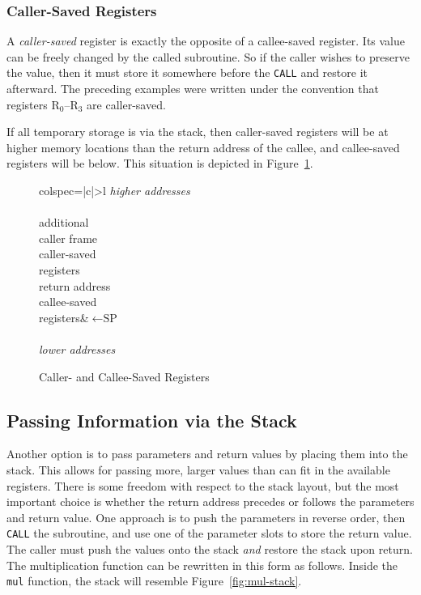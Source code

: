 \documentclass[12pt,english]{book}
\newcommand*{\concept}[2][]{%
  \textit{#2}\ifx#1\empty\empty\index{#2}\else\index{#1}\fi}
\begin{document}
\subsubsection{Caller-Saved Registers}
A \concept{caller-saved} register is exactly the opposite
of a callee-saved register.
Its value can be freely changed by the called subroutine.
So if the caller wishes to preserve the value,
then it must store it somewhere before the \texttt{CALL}
and restore it afterward.
The preceding examples were written under the convention
that registers \(\text{R}_0\)--\(\text{R}_3\) are caller-saved.

If all temporary storage is via the stack,
then caller-saved registers will be at higher memory locations
than the return address of the callee,
and callee-saved registers will be below.
This situation is depicted in Figure~\ref{fig:who-saves}.

\begin{figure}[ht!]\centering
  \begin{tblr}{colspec={|c|>{\hspace*{-3mm}}l}}
    \textit{higher addresses}\\\\
    additional\\
    caller frame\\
    caller-saved\\
    registers\\
    return address\\
    callee-saved\\
    registers&\({}\leftarrow\text{SP}\)\\\\
    \textit{lower addresses}\\
  \end{tblr}
  \caption{Caller- and Callee-Saved Registers}
  \label{fig:who-saves}
\end{figure}

\subsection{Passing Information via the Stack}
Another option is to pass parameters and return values
by placing them into the stack.
This allows for passing more, larger values
than can fit in the available registers.
There is some freedom with respect to the stack layout,
but the most important choice
is whether the return address precedes
or follows the parameters and return value.
One approach is to push the parameters in reverse order,
then \texttt{CALL} the subroutine,
and use one of the parameter slots to store
the return value.
The caller must push the values onto the stack
\emph{and} restore the stack upon return.
The multiplication function can be rewritten in this form
as follows.
Inside the \texttt{\textunderscore mul} function,
the stack will resemble Figure~\ref{fig:mul-stack}.
\end{document}
